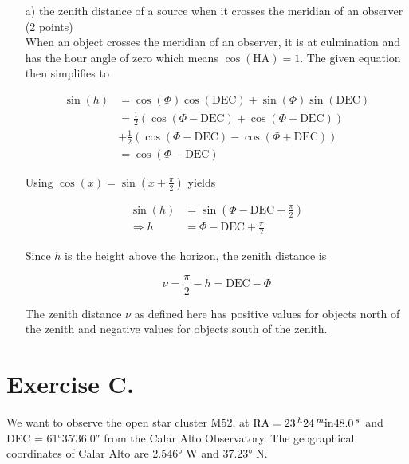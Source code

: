 \documentclass[11pt,a4paper,twoside]{article}
\begin{document}
\begin{enumerate}
 \item[a)] the zenith distance of a source when it crosses the meridian of an observer (2 points) \\
 When an object crosses the meridian of an observer, it is at culmination and has the hour angle of zero which means $\cos{ \left( \text{HA} \right)} = 1$. The given equation then simplifies to 
 
 \begin{align}
  \sin{ \left( h \right)} &= \cos{ \left( \Phi \right)} \cos{ \left( \text{DEC} \right)} + \sin{ \left( \Phi \right)} \sin{ \left( \text{DEC} \right)} \\
  &= \frac{1}{2} \left( \cos{ \left( \Phi - \text{DEC} \right)} + \cos{ \left( \Phi + \text{DEC} \right)} \right) \\ &+ \frac{1}{2} \left( \cos{ \left( \Phi - \text{DEC} \right)} - \cos{ \left( \Phi + \text{DEC} \right)} \right) \\
  &= \cos{ \left( \Phi - \text{DEC} \right)}
 \end{align}
  
 Using $\cos{ \left( x \right)} = \sin{ \left( x + \frac{\pi}{2} \right)}$ yields 
  
 \begin{align}
  \sin{ \left( h \right)} &= \sin{ \left( \Phi - \text{DEC} + \frac{\pi}{2} \right)} \\
  \Rightarrow h &= \Phi - \text{DEC} + \frac{\pi}{2}
 \end{align}
  
 Since $h$ is the height above the horizon, the zenith distance is 
  
 \begin{equation}
  \nu = \frac{\pi}{2} - h = \text{DEC} - \Phi
 \end{equation}
  
 The zenith distance $\nu$ as defined here has positive values for objects north of the zenith and negative values for objects south of the zenith. \\

\end{enumerate}

\section*{Exercise C.}

We want to observe the open star cluster M52, at $\text{RA} = \SI{23}{^\hour} \SI{24}{^\minute} \SI{48.0}{^\second}$ and DEC = \ang{61;35;36.0} from the Calar Alto Observatory. The geographical coordinates of Calar Alto are \ang{2.546} W and \ang{37.23} N.
\end{document}
